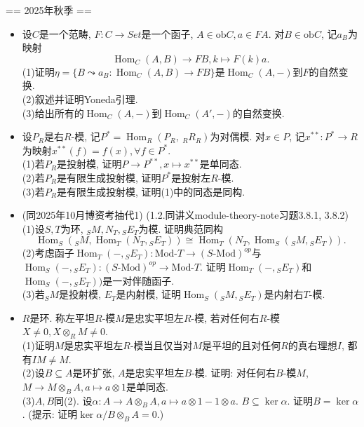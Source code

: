\def\Hom{\operatorname{Hom}}

== 2025年秋季 ==
\begin{itemize}
    \item[1.]设$C$是一个范畴, $F:C\to Set$是一个函子, $A\in \mathrm{ob}C, a\in FA$. 对$B\in \mathrm{ob}C$, 记$a_B$为映射
    $$\Hom_C(A,B)\to FB, k\mapsto F(k)a.$$
    (1)证明$\eta=\{B\leadsto a_B:\Hom_C(A,B)\to FB\}$是$\Hom_C(A,-)$到$F$的自然变换.\\
    (2)叙述并证明Yoneda引理.\\
    (3)给出所有的$\Hom_C(A,-)$到$\Hom_C(A',-)$的自然变换.
    \item[2.]设$P_R$是右$R$-模, 记$P^*=\Hom_R(P_R,\ _RR_R)$为对偶模. 对$x\in P$, 记$x^{**}:P^*\to R$为映射$x^{**}(f)=f(x),\forall f\in P^*$.\\
    (1)若$P_R$是投射模, 证明$P\to P^{**}, x\mapsto x^{**}$是单同态.\\
    (2)若$P_R$是有限生成投射模, 证明$P^*$是投射左$R$-模.\\
    (3)若$P_R$是有限生成投射模, 证明(1)中的同态是同构.
    \item[3.](同2025年10月博资考抽代1)
    (1.2.同讲义module-theory-note习题3.8.1, 3.8.2)\\
    (1)设$S,T$为环, ${}_SM, N_T, {}_SE_T$为模. 证明典范同构
    $$ \Hom_S({}_SM, \Hom_T(N_T, {}_SE_T)) \cong \Hom_T(N_T, \Hom_S({}_SM, {}_SE_T)). $$
    (2)考虑函子$\Hom_T(-, {}_SE_T) : \text{Mod-}T \to (S\text{-Mod})^{op}$与$\Hom_S(-, {}_SE_T) : (S\text{-Mod})^{op} \to \text{Mod-}T$. 证明$\Hom_T(-, {}_SE_T)$和$\Hom_S(-, {}_SE_T))$是一对伴随函子.\\
    (3)若$_SM$是投射模, $E_T$是内射模, 证明$\Hom_S(_{S}M,{}_{S}E_T)$是内射右$T$-模.
    \item[4.]$R$是环. 称左平坦$R$-模$M$是忠实平坦左$R$-模, 若对任何右$R$-模$X\neq0,X\otimes_R M\neq0$.\\
    (1)证明$M$是忠实平坦左$R$-模当且仅当对$M$是平坦的且对任何$R$的真右理想$I$, 都有$IM\neq M$.\\
    (2)设$B\subseteq A$是环扩张, $A$是忠实平坦左$B$-模. 证明: 对任何右$B$-模$M$, $M\to M\otimes_B A, a\mapsto a\otimes 1$是单同态.\\
    (3)$A,B$同(2). 设$\alpha: A\to A\otimes_B A, a\mapsto a\otimes1-1\otimes a$. $B\subseteq \ker\alpha$. 证明$B=\ker\alpha$. (提示: 证明$\ker\alpha/B\otimes_B A=0$.)
\end{itemize}


